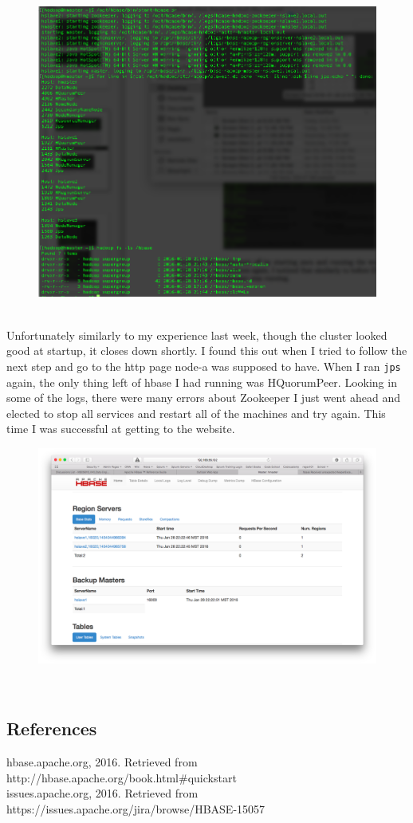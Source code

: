 \documentclass[10pt]{article}
\begin{document}
\begin{figure}[!h]
\includegraphics[scale=0.37]{superClust_start.png}
\centering
\end{figure}\\
\indent Unfortunately similarly to my experience last week, though the cluster looked good at startup, it closes down shortly. I found this out when I tried to follow the next step and go to the http page node-a was supposed to have. When I ran \verb|jps| again, the only thing left of hbase I had running was HQuorumPeer. Looking in some of the logs, there were many errors about Zookeeper I just went ahead and elected to stop all services and restart all of the machines and try again. This time I was successful at getting to the website.\\
\begin{figure}[!h]
\includegraphics[scale=0.30]{hbase_site.png}
\centering
\end{figure}\\
\subsection*{References}
hbase.apache.org, 2016. Retrieved from http://hbase.apache.org/book.html\#quickstart\\
issues.apache.org, 2016. Retrieved from https://issues.apache.org/jira/browse/HBASE-15057
\end{document}
